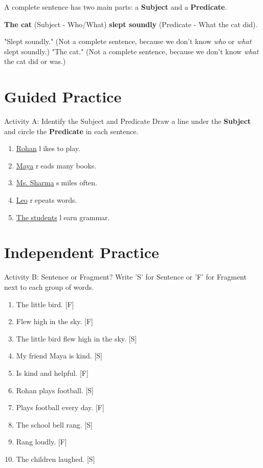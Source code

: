 A complete sentence has two main parts: a \textbf{Subject} and a \textbf{Predicate}.

\begin{examplebox}
    \textbf{The cat} (Subject - Who/What) \textbf{slept soundly} (Predicate - What the cat did).
\end{examplebox}

\begin{warningbox}
    "Slept soundly." (Not a complete sentence, because we don't know \textit{who} or \textit{what} slept soundly.)
    "The cat." (Not a complete sentence, because we don't know \textit{what} the cat did or was.)
\end{warningbox}

\section{Guided Practice}
\begin{activitybox}{Activity A: Identify the Subject and Predicate}
Draw a line under the \textbf{Subject} and circle the \textbf{Predicate} in each sentence.
\begin{enumerate}
    \item \underline{Rohan} \textcircled{likes to play}.
    \item \underline{Maya} \textcircled{reads many books}.
    \item \underline{Ms. Sharma} \textcircled{smiles often}.
    \item \underline{Leo} \textcircled{repeats words}.
    \item \underline{The students} \textcircled{learn grammar}.
\end{enumerate}
\end{activitybox}

\section{Independent Practice}
\begin{activitybox}{Activity B: Sentence or Fragment?}
Write 'S' for Sentence or 'F' for Fragment next to each group of words.
\begin{enumerate}
    \item The little bird. [F]
    \item Flew high in the sky. [F]
    \item The little bird flew high in the sky. [S]
    \item My friend Maya is kind. [S]
    \item Is kind and helpful. [F]
    \item Rohan plays football. [S]
    \item Plays football every day. [F]
    \item The school bell rang. [S]
    \item Rang loudly. [F]
    \item The children laughed. [S]
\end{enumerate}
\end{activitybox}


